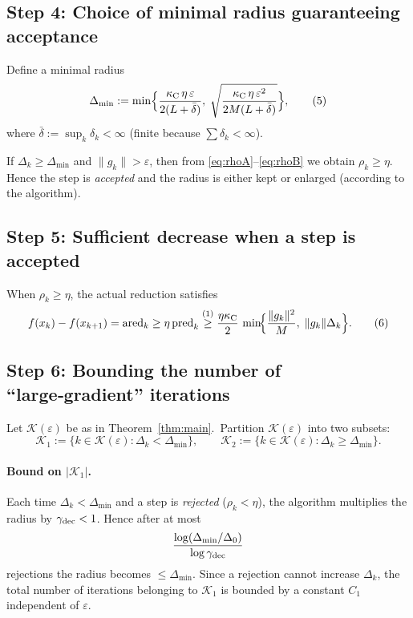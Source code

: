 \documentclass{article}
\begin{document}
\subsection*{Step 4: Choice of minimal radius guaranteeing acceptance}
Define a minimal radius
\[
\Delta_{\min}
:=\min\Bigl\{\frac{\kappa_{\rm C}\,\eta\,\varepsilon}{2(L+ \bar\delta)},\;
\sqrt{\frac{\kappa_{\rm C}\,\eta\,\varepsilon^{2}}{2M(L+\bar\delta)}}\Bigr\},
\tag{5}\label{eq:deltamin}
\]
where $\bar\delta:=\sup_{k}\delta_{k}<\infty$ (finite because $\sum\delta_{k}<\infty$).  

If $\Delta_{k}\ge\Delta_{\min}$ and $\|g_{k}\|>\varepsilon$, then from \eqref{eq:rhoA}–\eqref{eq:rhoB} we obtain $\rho_{k}\ge\eta$. Hence the step is \emph{accepted} and the radius is either kept or enlarged (according to the algorithm).

\subsection*{Step 5: Sufficient decrease when a step is accepted}
When $\rho_{k}\ge\eta$, the actual reduction satisfies
\[
f(x_{k})-f(x_{k+1})
= \text{ared}_{k}
\ge \eta\,\text{pred}_{k}
\stackrel{(1)}{\ge}
\frac{\eta\kappa_{\rm C}}{2}\,
\min\!\Bigl\{\frac{\|g_{k}\|^{2}}{M},\;\|g_{k}\|\Delta_{k}\Bigr\}.
\tag{6}\label{eq:suffdec}
\]

\subsection*{Step 6: Bounding the number of “large‑gradient” iterations}
Let $\mathcal{K}(\varepsilon)$ be as in Theorem~\ref{thm:main}.\,
Partition $\mathcal{K}(\varepsilon)$ into two subsets:
\[
\mathcal{K}_{1}:=\{k\in\mathcal{K}(\varepsilon):\Delta_{k}<\Delta_{\min}\},\qquad
\mathcal{K}_{2}:=\{k\in\mathcal{K}(\varepsilon):\Delta_{k}\ge\Delta_{\min}\}.
\]

\paragraph{Bound on $|\mathcal{K}_{1}|$.}
Each time $\Delta_{k}<\Delta_{\min}$ and a step is \emph{rejected} ($\rho_{k}<\eta$), the algorithm multiplies the radius by $\gamma_{\rm dec}<1$. Hence after at most
\[
\frac{\log(\Delta_{\min}/\Delta_{0})}{\log\gamma_{\rm dec}}
\]
rejections the radius becomes $\le\Delta_{\min}$. Since a rejection cannot increase $\Delta_{k}$, the total number of iterations belonging to $\mathcal{K}_{1}$ is bounded by a constant $C_{1}$ independent of $\varepsilon$.
\end{document}
